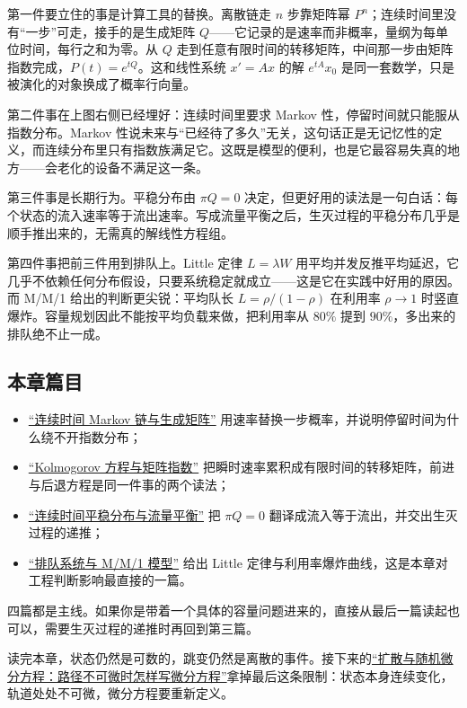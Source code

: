 第一件要立住的事是计算工具的替换。离散链走 \(n\) 步靠矩阵幂 \(P^{n}\)；连续时间里没有``一步''可走，接手的是生成矩阵 \(Q\)——它记录的是速率而非概率，量纲为每单位时间，每行之和为零。从 \(Q\) 走到任意有限时间的转移矩阵，中间那一步由矩阵指数完成，\(P(t)=e^{tQ}\)。这和线性系统 \(x'=Ax\) 的解 \(e^{tA}x_0\) 是同一套数学，只是被演化的对象换成了概率行向量。

第二件事在上图右侧已经埋好：连续时间里要求 Markov 性，停留时间就只能服从指数分布。Markov 性说未来与``已经待了多久''无关，这句话正是无记忆性的定义，而连续分布里只有指数族满足它。这既是模型的便利，也是它最容易失真的地方——会老化的设备不满足这一条。

第三件事是长期行为。平稳分布由 \(\pi Q=0\) 决定，但更好用的读法是一句白话：每个状态的流入速率等于流出速率。写成流量平衡之后，生灭过程的平稳分布几乎是顺手推出来的，无需真的解线性方程组。

第四件事把前三件用到排队上。Little 定律 \(L=\lambda W\) 用平均并发反推平均延迟，它几乎不依赖任何分布假设，只要系统稳定就成立——这是它在实践中好用的原因。而 M/M/1 给出的判断更尖锐：平均队长 \(L=\rho/(1-\rho)\) 在利用率 \(\rho\to 1\) 时竖直爆炸。容量规划因此不能按平均负载来做，把利用率从 \(80\%\) 提到 \(90\%\)，多出来的排队绝不止一成。

\subsection{本章篇目}

\begin{itemize}
\tightlist
\item \hyperref[sec:06-Random-Processes/05-Continuous-Time-Markov-Chains-and-Queues/01]{``连续时间 Markov 链与生成矩阵''} 用速率替换一步概率，并说明停留时间为什么绕不开指数分布；
\item \hyperref[sec:06-Random-Processes/05-Continuous-Time-Markov-Chains-and-Queues/02]{``Kolmogorov 方程与矩阵指数''} 把瞬时速率累积成有限时间的转移矩阵，前进与后退方程是同一件事的两个读法；
\item \hyperref[sec:06-Random-Processes/05-Continuous-Time-Markov-Chains-and-Queues/03]{``连续时间平稳分布与流量平衡''} 把 \(\pi Q=0\) 翻译成流入等于流出，并交出生灭过程的递推；
\item \hyperref[sec:06-Random-Processes/05-Continuous-Time-Markov-Chains-and-Queues/04]{``排队系统与 M/M/1 模型''} 给出 Little 定律与利用率爆炸曲线，这是本章对工程判断影响最直接的一篇。
\end{itemize}

四篇都是主线。如果你是带着一个具体的容量问题进来的，直接从最后一篇读起也可以，需要生灭过程的递推时再回到第三篇。

读完本章，状态仍然是可数的，跳变仍然是离散的事件。接下来的\hyperref[ch:051]{``扩散与随机微分方程：路径不可微时怎样写微分方程''}拿掉最后这条限制：状态本身连续变化，轨道处处不可微，微分方程要重新定义。
